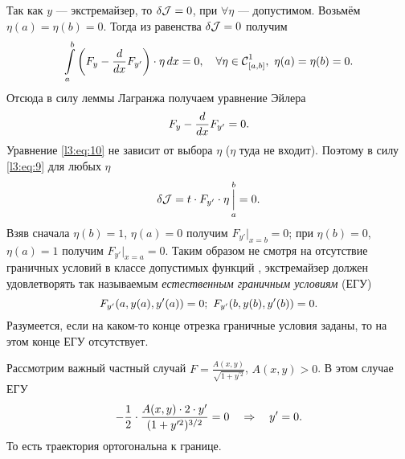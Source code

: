 Так как $y$ --- экстремайзер, то $\delta\mathcal{J}=0$, при $\forall\eta$ --- допустимом. Возьмём $\eta(a)=\eta(b)=0$. Тогда из равенства $\delta\mathcal{J}=0$ получим 
\begin{equation*}
	\hfill\int\limits_a^b\left(F_y-\der{}{x}F_{y'}\right)\cdot\eta\,dx=0,\quad \forall\eta\in\Cfn[{[a,b]}]{1},\ \eta(a)=\eta(b)=0.\hfill
\end{equation*}
Отсюда в силу леммы Лагранжа получаем уравнение Эйлера
\begin{equation}
	\label{l3:eq:10}
	\hfill F_{y}-\der{}{x}F_{y'}=0.\hfill
\end{equation}
Уравнение \eqref{l3:eq:10} не зависит от выбора $\eta$ ($\eta$  туда не входит). Поэтому в силу \eqref{l3:eq:9} для любых $\eta$
\begin{equation*}
	\hfill\delta\J=t\cdot F_{y'}\cdot\eta\mathop{\Big|}\limits_a^b=0.\hfill
\end{equation*}
Взяв сначала $\eta(b)=1$, $\eta(a)=0$ получим $F_{y'}\big|_{x=b}=0$; при $\eta(b)=0$, $\eta(a)=1$ получим $F_{y'}\big|_{x=a}=0$. Таким образом не смотря на отсутствие граничных условий в классе допустимых функций \K, экстремайзер должен удовлетворять так называемым \emph{естественным граничным условиям} (ЕГУ)
\vspace{-0.4cm}
\begin{equation}
	\label{l3:eq:11}
	\hfill F_{y'}(a,y(a),y'(a))=0;\ F_{y'}(b,y(b),y'(b))=0.\hfill
\end{equation}  
Разумеется, если на каком-то конце отрезка граничные условия заданы, то на этом конце ЕГУ отсутствует.

Рассмотрим важный частный случай $F=\displaystyle\frac{A(x,y)}{\sqrt{1+y^{\prime 2}}}$, $A(x,y)>0$. В этом случае ЕГУ
\begin{equation*}
	\hfill-\frac12\cdot\frac{A(x,y)\cdot2\cdot y'}{(1+y^{\prime2})^{3/2}}=0\quad\Rightarrow\quad y'=0.\hfill
\end{equation*} 
То есть траектория ортогональна к границе.

